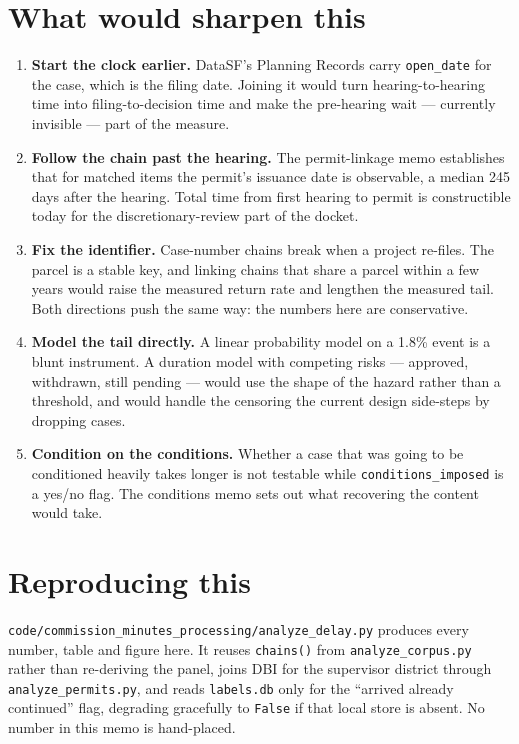 \documentclass[11pt]{article}
\begin{document}
\section{What would sharpen this}

\begin{enumerate}
\item \textbf{Start the clock earlier.} DataSF's Planning Records carry \texttt{open\_date} for
the case, which is the filing date. Joining it would turn hearing-to-hearing time into
filing-to-decision time and make the pre-hearing wait --- currently invisible --- part of the
measure.
\item \textbf{Follow the chain past the hearing.} The permit-linkage memo establishes that for
matched items the permit's issuance date is observable, a median 245 days after the hearing.
Total time from first hearing to permit is constructible today for the discretionary-review
part of the docket.
\item \textbf{Fix the identifier.} Case-number chains break when a project re-files. The
parcel is a stable key, and linking chains that share a parcel within a few years would raise
the measured return rate and lengthen the measured tail. Both directions push the same way:
the numbers here are conservative.
\item \textbf{Model the tail directly.} A linear probability model on a 1.8\% event is a blunt
instrument. A duration model with competing risks --- approved, withdrawn, still pending ---
would use the shape of the hazard rather than a threshold, and would handle the censoring the
current design side-steps by dropping cases.
\item \textbf{Condition on the conditions.} Whether a case that was going to be conditioned
heavily takes longer is not testable while \texttt{conditions\_imposed} is a yes/no flag. The
conditions memo sets out what recovering the content would take.
\end{enumerate}

\section{Reproducing this}

\texttt{code/commission\_minutes\_processing/analyze\_delay.py} produces every number, table
and figure here. It reuses \texttt{chains()} from \texttt{analyze\_corpus.py} rather than
re-deriving the panel, joins DBI for the supervisor district through
\texttt{analyze\_permits.py}, and reads \texttt{labels.db} only for the ``arrived already
continued'' flag, degrading gracefully to \texttt{False} if that local store is absent. No
number in this memo is hand-placed.
\end{document}
